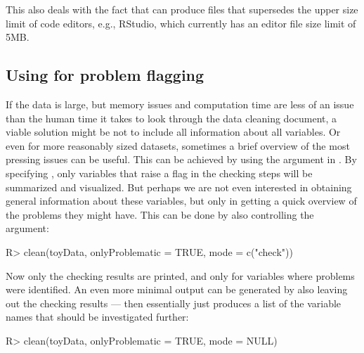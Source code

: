 \documentclass[article,shortnames]{jss}
\newcommand{\hl}[1]{\textcolor{magenta}{#1}}
\begin{document}
This also deals with the fact that  can produce
 files that supersedes the upper size limit of code editors, e.g.,
RStudio, which currently has an editor file size limit of 5MB. %

\subsection[Using dataMaid for problem flagging]{Using  for problem flagging}
If the data is large, but memory issues and computation time are less
of an issue than the human time it takes to look through the data
cleaning document, a viable solution might be not to include all
information about all variables. Or even for more reasonably sized
datasets, sometimes a brief overview of the most pressing issues can
be useful. This can be achieved by using the 
argument in . By specifying ,
only variables that raise a flag in the checking steps will be
summarized and visualized. But perhaps we are not even interested in
obtaining general information about these variables, but only in
getting a quick overview of the problems they might have. This can be
done by also controlling the  argument:

\begin{Schunk}
\begin{Sinput}
R> clean(toyData, onlyProblematic = TRUE, mode = c("check"))
\end{Sinput}
\end{Schunk}

Now only the checking results are printed, and only for variables
where problems were identified. An even more minimal output can be
generated by also leaving out the checking results --- then
 essentially just produces a list of the variable names
that should be investigated further:

\begin{Schunk}
\begin{Sinput}
R> clean(toyData, onlyProblematic = TRUE, mode = NULL)
\end{Sinput}
\end{Schunk}
\end{document}
